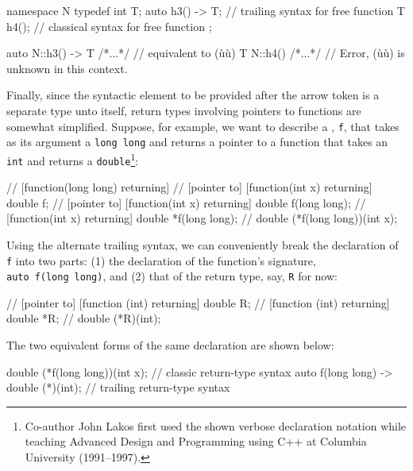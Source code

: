 \begin{emcppslisting}
namespace N
{
    typedef int T;
    auto h3() -> T;  // trailing syntax for free function
    T h4();          // classical syntax for free function
};

auto N::h3() -> T { /*...*/ }  // equivalent to (ù{}ù)
T    N::h4()      { /*...*/ }  // Error, (ù{}ù) is unknown in this context.
\end{emcppslisting}


Finally, since the syntactic element to be provided after the arrow
token is a separate type unto itself, return types involving pointers to
functions are somewhat simplified. Suppose, for example, we want to
describe a , \lstinline!f!, that takes as its
argument a \lstinline!long!~\lstinline!long! and returns a pointer to a
function that takes an \lstinline!int! and returns a
\lstinline!double!{\cprotect\footnote{Co-author John Lakos first used the shown verbose declaration notation
while teaching Advanced Design and Programming using C++ at Columbia
  University (1991--1997).}}:

\begin{emcppslisting}
// [function(long long) returning]
//     [pointer to] [function(int x) returning] double   f;
//     [pointer to] [function(int x) returning] double   f(long long);
//                  [function(int x) returning] double  *f(long long);
//                                              double (*f(long long))(int x);
\end{emcppslisting}

\noindent Using the alternate trailing syntax, we can conveniently break the
declaration of \lstinline!f! into two parts: (1) the declaration of the
function's signature, \lstinline!auto!~\lstinline!f(long!~\lstinline!long)!, and (2) that of the return type, say, \lstinline!R! for now:

\begin{emcppslisting}
// [pointer to] [function (int) returning] double   R;
//              [function (int) returning] double  *R;
//                                         double (*R)(int);
\end{emcppslisting}

\noindent The two equivalent forms of the same declaration are shown below:

\begin{emcppslisting}
double (*f(long long))(int x);         // classic return-type syntax
auto f(long long) -> double (*)(int);  // trailing return-type syntax
\end{emcppslisting}

